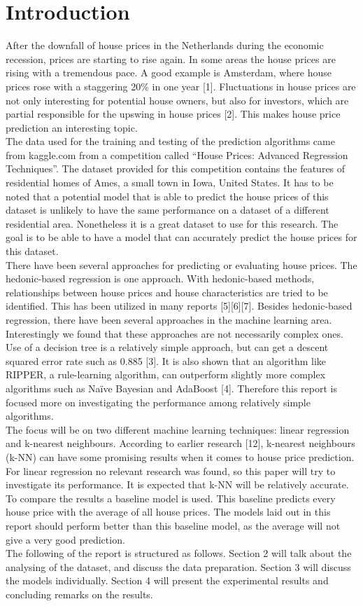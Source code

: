 \documentclass[a4paper,11pt]{article}
\begin{document}
\section{Introduction}
After the downfall of house prices in the Netherlands during the economic recession, prices are starting to rise again. In some areas the house prices are rising with a tremendous pace. A good example is Amsterdam, where house prices rose with a staggering 20\% in one year [1]. Fluctuations in house prices are not only interesting for potential house owners, but also for investors, which are partial responsible for the upswing in house prices [2]. This makes house price prediction an interesting topic. \\ 
\indent The data used for the training and testing of the prediction algorithms came from kaggle.com from a competition called “House Prices: Advanced Regression Techniques”. The dataset provided for this competition contains the features of residential homes of Ames, a small town in Iowa, United States. It has to be noted that a potential model that is able to predict the house prices of this dataset is unlikely to have the same performance on a dataset of a different residential area. Nonetheless it is a great dataset to use for this research. The goal is to be able to have a model that can accurately predict the house prices for this dataset. \\
\indent There have been several approaches for predicting or evaluating house prices. The hedonic-based regression is one approach. With hedonic-based methods, relationships between house prices and house characteristics are tried to be identified. This has been utilized in many reports [5][6][7].  Besides hedonic-based regression, there have been several approaches in the machine learning area. Interestingly we found that these approaches are not necessarily complex ones. Use of a decision tree is a relatively simple approach, but can get a descent squared error rate such as 0.885 [3]. It is also shown that an algorithm like RIPPER, a rule-learning algorithm, can outperform slightly more complex algorithms such as Naïve Bayesian and AdaBoost [4]. Therefore this report is focused more on investigating the performance among relatively simple algorithms.  \\ 
\indent The focus will be on two different machine learning techniques: linear regression and k-nearest neighbours. According to earlier research [12],  k-nearest neighbours (k-NN) can have some promising results when it comes to house price prediction. For linear regression no relevant research was found, so this paper will try to investigate its performance. It is expected that k-NN will be relatively accurate. To compare the results a baseline model is used. This baseline predicts every house price with the average of all house prices. The models laid out in this report should perform better than this baseline model, as the average will not give a very good prediction. \\
\indent The following of the report is structured as follows. Section 2 will talk about the analysing of the dataset, and discuss the data preparation. Section 3 will discuss the models individually. Section 4 will present the experimental results and concluding remarks on the results. 
\end{document}
